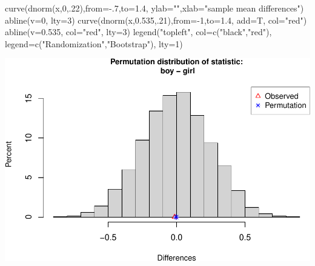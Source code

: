 \documentclass[
]{book}
\newenvironment{Shaded}{\begin{snugshade}}{\end{snugshade}}
\newcommand{\AttributeTok}[1]{\textcolor[rgb]{0.77,0.63,0.00}{#1}}
\newcommand{\DecValTok}[1]{\textcolor[rgb]{0.00,0.00,0.81}{#1}}
\newcommand{\FloatTok}[1]{\textcolor[rgb]{0.00,0.00,0.81}{#1}}
\newcommand{\FunctionTok}[1]{\textcolor[rgb]{0.00,0.00,0.00}{#1}}
\newcommand{\NormalTok}[1]{#1}
\newcommand{\SpecialCharTok}[1]{\textcolor[rgb]{0.00,0.00,0.00}{#1}}
\newcommand{\StringTok}[1]{\textcolor[rgb]{0.31,0.60,0.02}{#1}}
\begin{document}
\begin{Shaded}
\begin{Highlighting}[]
\FunctionTok{curve}\NormalTok{(}\FunctionTok{dnorm}\NormalTok{(x,}\DecValTok{0}\NormalTok{,.}\DecValTok{22}\NormalTok{),}\AttributeTok{from=}\SpecialCharTok{{-}}\NormalTok{.}\DecValTok{7}\NormalTok{,}\AttributeTok{to=}\FloatTok{1.4}\NormalTok{, }\AttributeTok{ylab=}\StringTok{""}\NormalTok{,}\AttributeTok{xlab=}\StringTok{"sample mean differences"}\NormalTok{)}
\FunctionTok{abline}\NormalTok{(}\AttributeTok{v=}\DecValTok{0}\NormalTok{, }\AttributeTok{lty=}\DecValTok{3}\NormalTok{)}
\FunctionTok{curve}\NormalTok{(}\FunctionTok{dnorm}\NormalTok{(x,}\FloatTok{0.535}\NormalTok{,.}\DecValTok{21}\NormalTok{),}\AttributeTok{from=}\SpecialCharTok{{-}}\DecValTok{1}\NormalTok{,}\AttributeTok{to=}\FloatTok{1.4}\NormalTok{, }\AttributeTok{add=}\NormalTok{T, }\AttributeTok{col=}\StringTok{"red"}\NormalTok{)}
\FunctionTok{abline}\NormalTok{(}\AttributeTok{v=}\FloatTok{0.535}\NormalTok{, }\AttributeTok{col=}\StringTok{"red"}\NormalTok{, }\AttributeTok{lty=}\DecValTok{3}\NormalTok{)}
\FunctionTok{legend}\NormalTok{(}\StringTok{"topleft"}\NormalTok{, }\AttributeTok{col=}\FunctionTok{c}\NormalTok{(}\StringTok{"black"}\NormalTok{,}\StringTok{"red"}\NormalTok{), }\AttributeTok{legend=}\FunctionTok{c}\NormalTok{(}\StringTok{"Randomization"}\NormalTok{,}\StringTok{"Bootstrap"}\NormalTok{), }\AttributeTok{lty=}\DecValTok{1}\NormalTok{)}
\end{Highlighting}
\end{Shaded}

\includegraphics[width=1\linewidth]{Class_Activity_14_files/figure-latex/unnamed-chunk-11-1}

\vspace*{1in}
\end{document}

